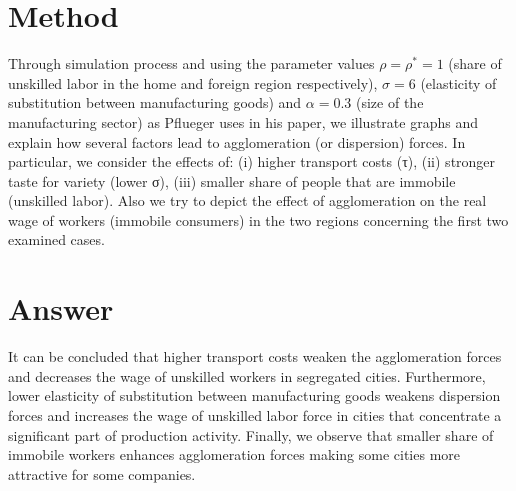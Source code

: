 \documentclass[11pt]{article}
\begin{document}
\section{Method}
Through simulation process and using the parameter values $\rho=\rho^*=1$ (share of unskilled labor in the home and foreign region respectively), $\sigma=6$ (elasticity of substitution between manufacturing goods) and $\alpha=0.3$ (size of the manufacturing sector) as Pflueger uses in his paper, we illustrate graphs and explain how several factors lead to agglomeration (or dispersion) forces. In particular, we consider the effects of:  
(i) higher transport costs (τ),  
(ii) stronger taste for variety (lower σ),  
(iii) smaller share of people that are immobile (unskilled labor).  
Also we try to depict the effect of agglomeration on the real wage of workers (immobile consumers) in the two regions concerning the first two examined cases.
\section{Answer}
It can be concluded that higher transport costs weaken the agglomeration forces and decreases the wage of unskilled workers in segregated cities. Furthermore, lower elasticity of substitution between manufacturing goods weakens dispersion forces and increases the wage of unskilled labor force in cities that concentrate a significant part of production activity. Finally, we observe that smaller share of immobile workers enhances agglomeration forces making some cities more attractive for some companies.
\end{document}
